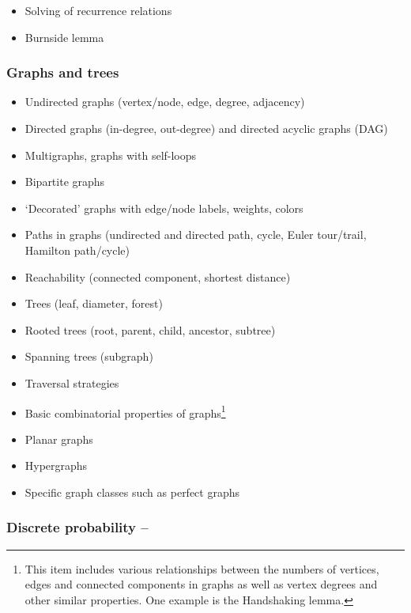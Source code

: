 \documentclass[12pt]{article}
\begin{document}
		\begin{itemize}[label=]
			\item Solving of recurrence relations
			\item Burnside lemma
		\end{itemize}
	
		\subsubsection{Graphs and trees}
		\begin{itemize}[label=]
			\item Undirected graphs (vertex/node, edge, degree, adjacency)
			\item Directed graphs (in-degree, out-degree) and directed acyclic graphs (DAG)
			\item Multigraphs, graphs with self-loops
			\item Bipartite graphs
			\item ‘Decorated’ graphs with edge/node labels, weights, colors
			\item Paths in graphs (undirected and directed path, cycle, Euler tour/trail, Hamilton path/cycle)
			\item Reachability (connected component, shortest distance)
			\item Trees (leaf, diameter, forest)
			\item Rooted trees (root, parent, child, ancestor, subtree)
			\item Spanning trees (subgraph)
			\item Traversal strategies
			\item Basic combinatorial properties of graphs\footnote{This item includes various relationships between the numbers of vertices, edges and connected components in graphs as well as vertex degrees and other similar properties. One example is the Handshaking lemma.}
		\end{itemize}
	
		\begin{itemize}[label=]
			\item Planar graphs
			\item Hypergraphs
			\item Specific graph classes such as perfect graphs
		\end{itemize}
			
		\subsubsection{Discrete probability – }
	
\end{document}
